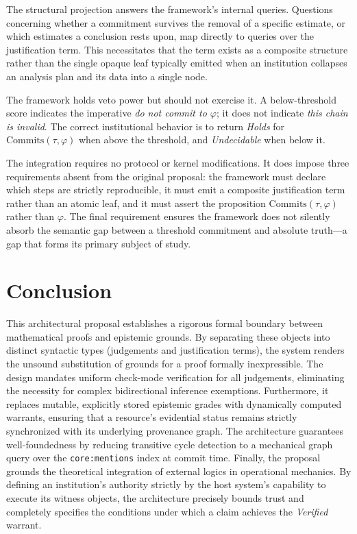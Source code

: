 \documentclass[manuscript,nonacm=true]{acmart}
\newcommand{\code}[1]{\texttt{\small #1}}
\begin{document}
The structural projection answers the framework's internal queries. Questions concerning whether a commitment survives the removal of a specific estimate, or which estimates a conclusion rests upon, map directly to queries over the justification term. This necessitates that the term exists as a composite structure rather than the single opaque leaf typically emitted when an institution collapses an analysis plan and its data into a single node.

The framework holds veto power but should not exercise it. A below-threshold score indicates the imperative \emph{do not commit to $\varphi$}; it does not indicate \emph{this chain is invalid}. The correct institutional behavior is to return \emph{Holds} for $\mathrm{Commits}(\tau,\varphi)$ when above the threshold, and \emph{Undecidable} when below it.

The integration requires no protocol or kernel modifications. It does impose three requirements absent from the original proposal: the framework must declare which steps are strictly reproducible, it must emit a composite justification term rather than an atomic leaf, and it must assert the proposition $\mathrm{Commits}(\tau,\varphi)$ rather than $\varphi$. The final requirement ensures the framework does not silently absorb the semantic gap between a threshold commitment and absolute truth---a gap that forms its primary subject of study.

\section{Conclusion}

This architectural proposal establishes a rigorous formal boundary between mathematical proofs and epistemic grounds. By separating these objects into distinct syntactic types (judgements and justification terms), the system renders the unsound substitution of grounds for a proof formally inexpressible. The design mandates uniform check-mode verification for all judgements, eliminating the necessity for complex bidirectional inference exemptions. Furthermore, it replaces mutable, explicitly stored epistemic grades with dynamically computed warrants, ensuring that a resource's evidential status remains strictly synchronized with its underlying provenance graph. The architecture guarantees well-foundedness by reducing transitive cycle detection to a mechanical graph query over the \code{core:mentions} index at commit time. Finally, the proposal grounds the theoretical integration of external logics in operational mechanics. By defining an institution's authority strictly by the host system's capability to execute its witness objects, the architecture precisely bounds trust and completely specifies the conditions under which a claim achieves the \emph{Verified} warrant.
\end{document}
